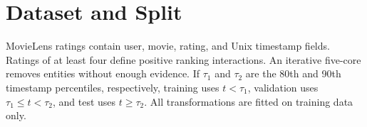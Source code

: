 \section{Dataset and Split}
MovieLens ratings contain user, movie, rating, and Unix timestamp fields.
Ratings of at least four define positive ranking interactions. An iterative
five-core removes entities without enough evidence. If $\tau_1$ and $\tau_2$
are the 80th and 90th timestamp percentiles, respectively, training uses
$t<\tau_1$, validation uses $\tau_1\le t<\tau_2$, and test uses
$t\ge\tau_2$. All transformations are fitted on training data only.
